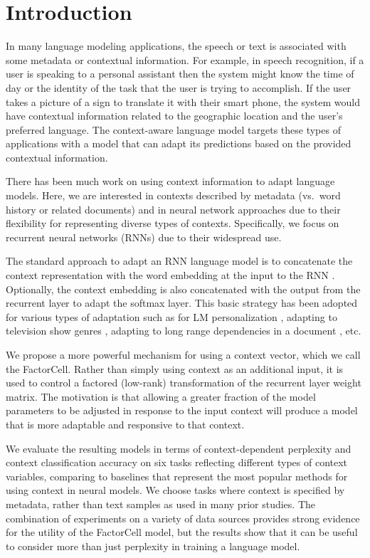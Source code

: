 \section{Introduction}

In many language modeling applications, the speech or text is associated with some metadata or contextual information. For example, in speech recognition, if a user is speaking to a personal assistant then the system might know the time of day or the identity of the task that the user is trying to accomplish. If the user takes a picture of a sign to translate it with their smart phone, the system would have contextual information related to the geographic location and the user's preferred language. The context-aware language model targets these types of applications with a model that can adapt its predictions based on the provided contextual information.

There has been much work on using context information to adapt language models. Here, we are interested in contexts described by metadata (vs.\ word history or related documents) and in neural network approaches due to their flexibility for representing diverse types of contexts. Specifically, we focus on recurrent neural networks (RNNs) due to their widespread use. 

The standard approach to adapt an RNN language model is to concatenate the context representation with the word embedding at the input to the RNN \cite{mikolov2012context}. Optionally, the context embedding is also concatenated with the output from the recurrent layer to adapt the softmax layer. This basic strategy has been adopted for various types of adaptation such as for LM personalization \cite{wen2013recurrent,li2016persona}, adapting to television show genres \cite{chen2015recurrent}, adapting to long range dependencies in a document \cite{Ji2015DocumentCL}, etc.

We propose a more powerful mechanism for using a context vector, which we call the FactorCell. Rather than simply using context as an additional input, it is used to control a factored (low-rank) transformation of the recurrent layer weight matrix. The motivation is that allowing a greater fraction of the model parameters to be adjusted in response to the input context will produce a model that is more adaptable and responsive to that context. 


We evaluate the resulting models in terms of context-dependent perplexity and context classification accuracy on six tasks reflecting different types of context variables, comparing to baselines that represent the most popular methods for using context in neural models. 
We choose tasks where context is specified by metadata, rather than text samples as used in many prior studies.
The combination of experiments on a variety of data sources provides strong evidence for the utility of the FactorCell model, but the results show that it can be useful to consider more than just perplexity in training a language model.


